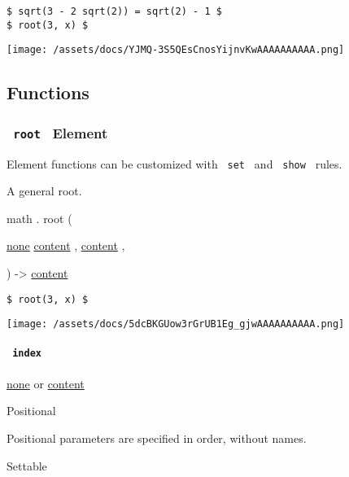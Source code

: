 \begin{verbatim}
$ sqrt(3 - 2 sqrt(2)) = sqrt(2) - 1 $
$ root(3, x) $
\end{verbatim}

\texttt{[image: /assets/docs/YJMQ-3S5QEsCnosYijnvKwAAAAAAAAAA.png]}

\subsection{Functions}\label{functions}

\subsubsection{\texorpdfstring{\texttt{\ root\ } {{ Element
}}}{ root   Element }}\label{functions-root}

\label{functions-root-element-tooltip}
Element functions can be customized with \texttt{\ set\ } and
\texttt{\ show\ } rules.

A general root.

math { . } { root } (

{ \hyperref[functions-root-parameters-index]{}
\href{/docs/reference/foundations/none/}{none}
\href{/docs/reference/foundations/content/}{content} , } {
\href{/docs/reference/foundations/content/}{content} , }

) -\textgreater{} \href{/docs/reference/foundations/content/}{content}

\begin{verbatim}
$ root(3, x) $
\end{verbatim}

\texttt{[image: /assets/docs/5dcBKGUow3rGrUB1Eg\_gjwAAAAAAAAAA.png]}

\paragraph{\texorpdfstring{\texttt{\ index\ }}{ index }}\label{functions-root-index}

\href{/docs/reference/foundations/none/}{none} {or}
\href{/docs/reference/foundations/content/}{content}

{{ Positional }}

\label{functions-root-index-positional-tooltip}
Positional parameters are specified in order, without names.

{{ Settable }}

